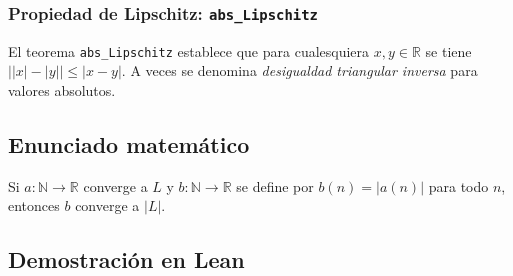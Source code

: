 \subsubsection{Propiedad de Lipschitz: \texttt{abs\_Lipschitz}}

El teorema \texttt{abs\_Lipschitz} establece que para cualesquiera $x, y
\in \mathbb{R}$ se tiene $\big||x| - |y|\big| \leq |x - y|$. A veces se
denomina \emph{desigualdad triangular inversa} para valores absolutos.

\subsection{Enunciado matemático}

\begin{theorem}
Si $a : \mathbb{N} \to \mathbb{R}$ converge a $L$ y $b : \mathbb{N} \to
\mathbb{R}$ se define por $b(n) = |a(n)|$ para todo $n$, entonces $b$
converge a $|L|$.
\end{theorem}

\subsection{Demostración en Lean}

